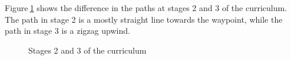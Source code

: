 Figure$~$\ref{curriculum} shows the difference in the paths at stages 2 and 3 of the curriculum. The path in stage 2 is a mostly straight line towards the waypoint, while the path in stage 3 is a zigzag upwind. 

\begin{figure}
    \centering
    \caption{Stages 2 and 3 of the curriculum}\label{curriculum}
\end{figure}

